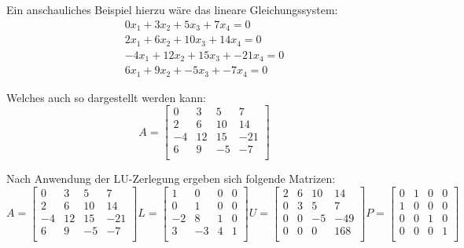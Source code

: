 \documentclass[course=erap]{aspdoc}
\begin{document}
Ein anschauliches Beispiel hierzu wäre das lineare Gleichungssystem:
\begin{eqnarray}
0x_1 + 3x_2 + 5x_3 + 7x_4 = 0 \\
2x_1 + 6x_2 + 10x_3 + 14x_4 = 0\\
-4x_1 + 12x_2 + 15x_3 + -21x_4 = 0\\
6x_1 + 9x_2 + -5x_3 + -7x_4 = 0
\end{eqnarray}



Welches auch so dargestellt werden kann:
\begin{equation}
A = \begin{bmatrix}
 0	& 3	 & 5  & 7 \\
 2	& 6	 & 10 & 14 \\
-4	& 12 & 15 & -21\\
 6	& 9  & -5 & -7\\
 \end{bmatrix}
\end{equation}



Nach Anwendung der LU-Zerlegung ergeben sich folgende Matrizen:
 \begin{equation}

 A = \begin{bmatrix}
 0	& 3	 & 5  & 7 \\
 2	& 6	 & 10 & 14 \\
-4	& 12 & 15 & -21\\
 6	& 9  & -5 & -7\\
 \end{bmatrix}
  L =
 \begin{bmatrix}
 1	& 0	 & 0  & 0 \\
 0	& 1	 & 0 & 0 \\
-2	& 8 & 1 & 0\\
 3	& -3  & 4 & 1\\
 \end{bmatrix}
 U =
\begin{bmatrix}
 2	& 6	 & 10 & 14 \\
 0	& 3	 & 5 &  7 \\
 0	& 0  & -5 & -49\\
 0	& 0  & 0 &  168\\
 \end{bmatrix}
 P =
 \begin{bmatrix}
 0	& 1	 & 0 & 0 \\
 1	& 0	 & 0 & 0 \\
 0	& 0  & 1 & 0\\
 0	& 0  & 0 & 1\\
 \end{bmatrix}
 \end{equation}
 
\end{document}

